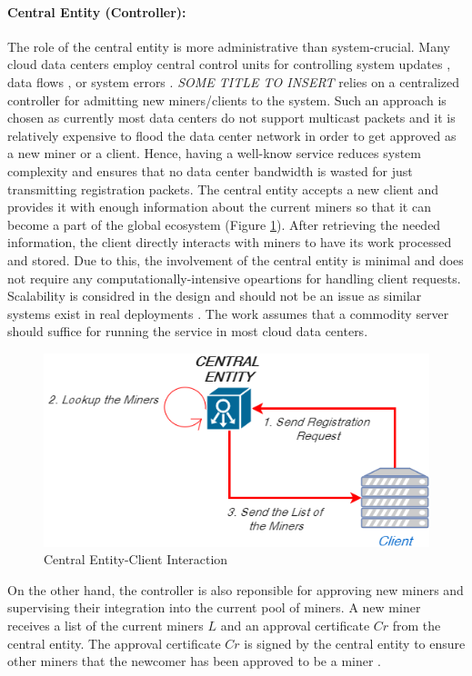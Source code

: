 \documentclass{article}
\newcommand{\projTitle}{SOME TITLE TO INSERT}
\begin{document}
\paragraph{Central Entity (Controller):} The role of the central entity is more administrative than system-crucial. Many cloud data centers employ central control units for controlling system updates \cite{microsoft-autopilot}, data flows \cite{google_jupiter}, or system errors \cite{microsoft_netpoirot}. \textit{\projTitle} relies on a centralized controller for admitting new miners/clients to the system. Such an approach is chosen as currently most data centers do not support multicast packets and it is relatively expensive to flood the data center network in order to get approved as a new miner or a client. Hence, having a well-know service reduces system complexity and ensures that no data center bandwidth is wasted for just transmitting registration packets. The central entity accepts a new client and provides it with enough information about the current miners so that it can become a part of the global ecosystem (Figure \ref{fig:central_entity_client_reg}). After retrieving the needed information, the client directly interacts with miners to have its work processed and stored. Due to this, the involvement of the central entity is minimal and does not require any computationally-intensive opeartions for handling client requests. Scalability is considred in the design and should not be an issue as similar systems exist in real deployments \cite{hadoop_example}. The work assumes that a commodity server should suffice for running the service in most cloud data centers. 
\par

\begin{figure}[h]
  \includegraphics[width=0.5\linewidth]{figures/central_entity_client_reg.png}
  \caption{Central Entity-Client Interaction}
  \label{fig:central_entity_client_reg}
\end{figure}


\noindent \newline On the other hand, the controller is also reponsible for approving new miners and supervising their integration into the current pool of miners. A new miner receives a list of the current miners $L$ and an approval certificate $Cr$ from the central entity.
The approval certificate $Cr$ is signed by the central entity to ensure other miners that the newcomer has been approved to be a miner \cite{public-auth-certificate}.
\end{document}
